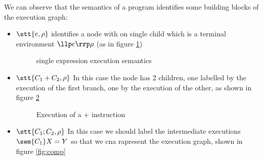 \begin{observation}
  We can observe that the semantics of a program identifies some
  building blocks of the execution graph:
  \begin{itemize}
  \item \(\stt{e,\rho}\) identifies a node with on single child which
    is a terminal environment \(\llp e \rrp \rho\) (as in figure \ref{fig:base})
    \begin{figure}
      \centering
      \caption{single expression execution semantics}\label{fig:base}
    \end{figure}
  \item \(\stt{C_1 + C_2, \rho}\) In this case the node has 2
    children, one labelled by the execution of the first branch, one
    by the execution of the other, as shown in figure \ref{fig:branch}
    \begin{figure}
      \centering
      \caption{Execution of a \(+\) instruction}\label{fig:branch}
    \end{figure}
  \item \(\stt{C_1;C_2, \rho}\) In this case we should label the
    intermediate executions \(\sem{C_1}X = Y\) so that we cna
    rapresent the execution graph, shown in figure \ref{fig:comp}
    \begin{figure}
      \centering
\end{figure}
\end{itemize}
\end{observation}
